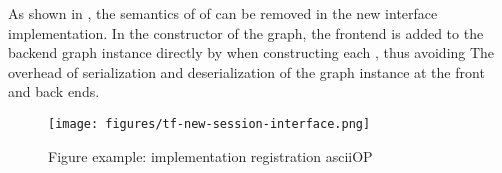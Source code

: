 \begin{content}
As shown in , the semantics of  of  can be removed in the new interface implementation. In the constructor of the graph, the frontend  is added to the backend  graph instance directly by  when constructing each , thus avoiding The overhead of serialization and deserialization of the graph instance at the front and back ends.

\begin{figure}[H]
  \centering
  \texttt{[image: figures/tf-new-session-interface.png]}
  \caption{Figure example: implementation registration ascii{OP}}
  \label{fig:tf-new-session-interface}
\end{figure}

\end{content}
